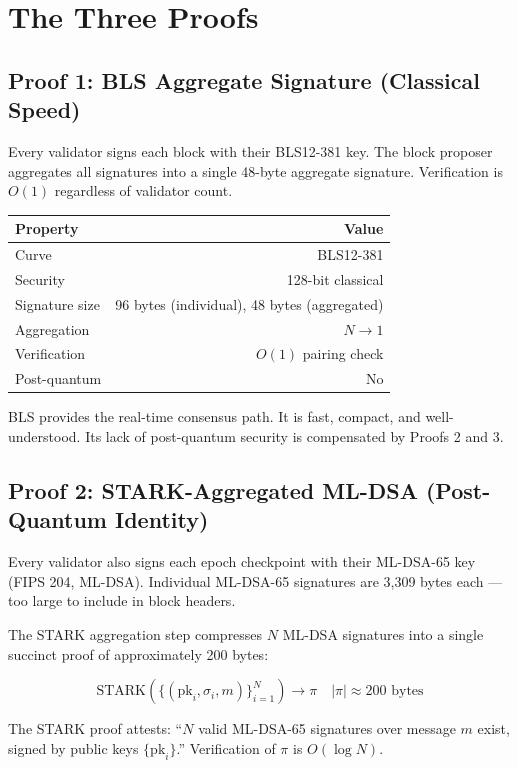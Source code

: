 \section{The Three Proofs}


\subsection{Proof 1: BLS Aggregate Signature (Classical Speed)}

Every validator signs each block with their BLS12-381 key. The block proposer aggregates all signatures into a single 48-byte aggregate signature. Verification is $O(1)$ regardless of validator count.

\begin{center}
\begin{tabular}{lr}
\toprule
\textbf{Property} & \textbf{Value} \\
\midrule
Curve & BLS12-381 \\
Security & 128-bit classical \\
Signature size & 96 bytes (individual), 48 bytes (aggregated) \\
Aggregation & $N \to 1$ \\
Verification & $O(1)$ pairing check \\
Post-quantum & No \\
\bottomrule
\end{tabular}
\end{center}

BLS provides the real-time consensus path. It is fast, compact, and well-understood. Its lack of post-quantum security is compensated by Proofs 2 and 3.

\subsection{Proof 2: STARK-Aggregated ML-DSA (Post-Quantum Identity)}

Every validator also signs each epoch checkpoint with their ML-DSA-65 key (FIPS 204, ML-DSA). Individual ML-DSA-65 signatures are 3,309 bytes each --- too large to include in block headers.

The STARK aggregation step compresses $N$ ML-DSA signatures into a single succinct proof of approximately 200 bytes:

$$\text{STARK}(\{(\text{pk}_i, \sigma_i, m)\}_{i=1}^{N}) \to \pi \quad |\pi| \approx 200 \text{ bytes}$$

The STARK proof attests: ``$N$ valid ML-DSA-65 signatures over message $m$ exist, signed by public keys $\{\text{pk}_i\}$.'' Verification of $\pi$ is $O(\log N)$.

